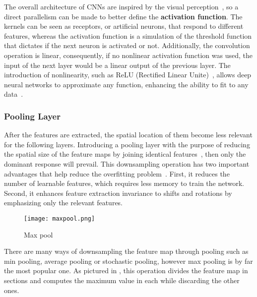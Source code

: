 \documentclass[class=report, crop=false, a4paper, 12pt]{standalone}
\begin{document}
\par The overall architecture of CNNs are inspired by the visual perception~\autocite{hubelReceptiveFieldsBinocular1962}, so a direct parallelism can be made to better define the \textbf{activation function}. The kernels can be seen as receptors, or artificial neurons, that respond to different features, whereas the activation function is a simulation of the threshold function that dictates if the next neuron is activated or not. Additionally, the convolution operation is linear, consequently, if no nonlinear activation function was used, the input of the next layer would be a linear output of the previous layer. The introduction of nonlinearity, such as ReLU (Rectified Linear Unite)~\autocite{nairRectifiedLinearUnits}, allows deep neural networks to approximate any function, enhancing the ability to fit to any data~\autocite{liSurveyConvolutionalNeural2022}.

\subsubsection{Pooling Layer}
After the features are extracted, the spatial location of them become less relevant for the following layers. Introducing a pooling layer with the purpose of reducing the spatial size of the feature maps by joining identical features~\autocite{lecunDeepLearning2015, guRecentAdvancesConvolutional2018}, then only the dominant response will prevail. This downsampling operation has two important advantages that help reduce the overfitting problem~\autocite{ajitReviewConvolutionalNeural2020,liSurveyConvolutionalNeural2022}. First, it reduces the number of learnable features, which requires less memory to train the network. Second, it enhances feature extraction invariance to shifts and rotations by emphasizing only the relevant features.

\begin{figure}[!h]
    \centering
    \texttt{[image: maxpool.png]} %
    \caption{Max pool}
    \label{fig:maxpool}
\end{figure}

There are many ways of downsampling the feature map through pooling such as min pooling, average pooling or stochastic pooling, however max pooling is by far the most popular one. As pictured in , this operation divides the feature map in sections and computes the maximum value in each while discarding the other ones.
\end{document}
